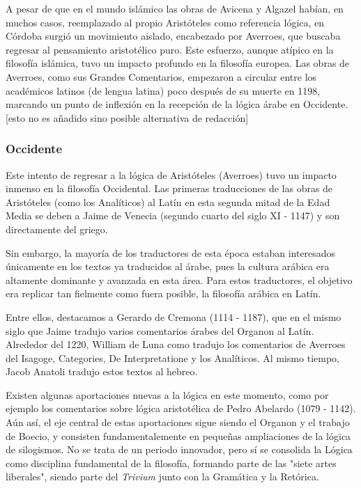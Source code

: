 \documentclass{article}
\begin{document}
A pesar de que en el mundo islámico las obras de Avicena y Algazel habían, en muchos casos, reemplazado al propio Aristóteles como referencia lógica, en Córdoba surgió un movimiento aislado, encabezado por Averroes, que buscaba regresar al pensamiento aristotélico puro. Este esfuerzo, aunque atípico en la filosofía islámica, tuvo un impacto profundo en la filosofía europea. Las obras de Averroes, como sus Grandes Comentarios, empezaron a circular entre los académicos latinos (de lengua latina) poco después de su muerte en 1198, marcando un punto de inflexión en la recepción de la lógica árabe en Occidente\cite{street2001arabic, charles2004latin}. [esto no es añadido sino posible alternativa de redacción]

\subsubsection{Occidente}

Este intento de regresar a la lógica de Aristóteles (Averroes) tuvo un impacto inmenso en la filosofía Occidental. Las primeras traducciones de las obras de Aristóteles (como los Analíticos) al Latín en esta segunda mitad de la Edad Media se deben a Jaime de Venecia (segundo cuarto del siglo XI - 1147) y son directamente del griego.

Sin embargo, la mayoría de los traductores de esta época estaban interesados únicamente en los textos ya traducidos al árabe, pues la cultura arábica era altamente dominante y avanzada en esta área. Para estos traductores, el objetivo era replicar tan fielmente como fuera posible, la filosofía arábica en Latín.

Entre ellos, destacamos a Gerardo de Cremona (1114 - 1187), que en el mismo siglo que Jaime tradujo varios comentarios árabes del Organon al Latín. Alrededor del 1220, William de Luna como tradujo los comentarios de Averroes del Isagoge, Categories, De Interpretatione y los Analíticos. Al mismo tiempo, Jacob Anatoli tradujo estos textos al hebreo\cite{charles2004latin}.

Existen algunas aportaciones nuevas a la lógica en este momento, como por ejemplo los comentarios sobre lógica aristotélica de Pedro Abelardo (1079 - 1142). Aún así, el eje central de estas aportaciones sigue siendo el Organon y el trabajo de Boecio, y consisten fundamentalemente en pequeñas ampliaciones de la lógica de silogismos. No se trata de un periodo innovador, pero sí se consolida la Lógica como disciplina fundamental de la filosofía\cite{marebon2008logic}, formando parte de las "siete artes liberales", siendo parte del \textit{Trivium} junto con la Gramática y la Retórica\cite{dutilh2008logic}.
\end{document}
